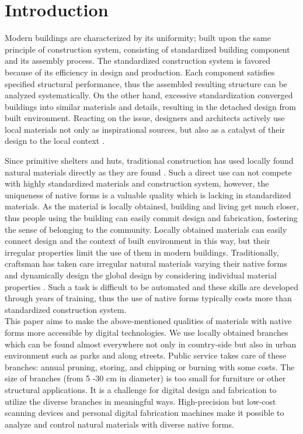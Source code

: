 \section{Introduction}
Modern buildings are characterized by its uniformity; built upon the same principle of construction system, consisting of standardized building component and its assembly process.
The standardized construction system is favored because of its efficiency in design and production.
Each component satisfies specified structural performance, thus the assembled resulting structure can be analyzed systematically.
On the other hand, excessive standardization converged buildings into similar materials and details, resulting in the detached design from built environment.
Reacting on the issue, designers and architects actively use local materials not only as inspirational sources, but also as a catalyst of their design to the local context \cite{oliver1997encyclopedia}.

Since primitive shelters and huts, traditional construction has used locally found natural materials directly as they are found \cite{weston2003materials}.
Such a direct use can not compete with highly standardized materials and construction system, however, the uniqueness of native forms is a valuable quality which is lacking in standardized materials.
As the material is locally obtained, building and living get much closer, thus people using the building can easily commit design and fabrication, fostering the sense of belonging to the community.
Locally obtained materials can easily connect design and the context of built environment in this way, but their irregular properties limit the use of them in modern buildings.
Traditionally, craftsman has taken care irregular natural materials varying their native forms and dynamically design the global design by considering individual material properties \cite{pye1968nature}.
Such a task is difficult to be automated and these skills are developed through years of training, thus the use of native forms typically costs more than standardized construction system. \\

This paper aims to make the above-mentioned qualities of materials with native forms more accessible by digital technologies.
We use locally obtained branches which can be found almost everywhere not only in country-side but also in urban environment such as parks and along streets.
Public service takes care of these branches: annual pruning, storing, and chipping or burning with some costs.
The size of branches (from 5 -30 cm in diameter) is too small for furniture or other structural applications.
It is a challenge for digital design and fabrication to utilize the diverse branches in meaningful ways.
High-precision but low-cost scanning devices and personal digital fabrication machines make it possible to analyze and control natural materials with diverse native forms.

